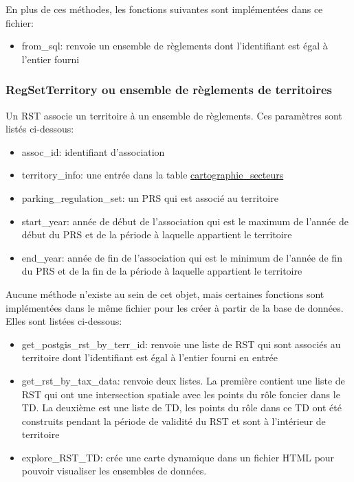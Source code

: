         En plus de ces méthodes, les fonctions suivantes sont implémentées dans ce fichier:
        \begin{itemize}
            \item from\_sql: renvoie un ensemble de règlements dont l'identifiant est égal à l'entier fourni
        \end{itemize}
        
        \subsubsection{RegSetTerritory ou ensemble de règlements de territoires}
        Un \ac{RST} associe un territoire à un ensemble de règlements. Ces paramètres sont listés ci-dessous:
        \begin{itemize}
            \item assoc\_id: identifiant d'association
            \item territory\_info: une entrée dans la table \underline{cartographie\_secteurs}
            \item parking\_regulation\_set: un \ac{PRS} qui est associé au territoire
            \item start\_year: année de début de l'association qui est le maximum de l'année de début du \ac{PRS} et de la période à laquelle appartient le territoire
            \item end\_year: année de fin de l'association qui est le minimum de l'année de fin du \ac{PRS} et de la fin de la période à laquelle appartient le territoire
        \end{itemize}
        Aucune méthode n'existe au sein de cet objet, mais certaines fonctions sont implémentées dans le même fichier pour les créer à partir de la base de données. Elles sont listées ci-dessous:
        \begin{itemize}
            \item get\_postgis\_rst\_by\_terr\_id: renvoie une liste de \ac{RST} qui sont associés au territoire dont l'identifiant est égal à l'entier fourni en entrée
            \item get\_rst\_by\_tax\_data: renvoie deux listes. La première contient une liste de \ac{RST} qui ont une intersection spatiale avec les points du rôle foncier dans le \ac{TD}. La deuxième est une liste de \ac{TD}, les points du rôle dans ce \ac{TD} ont été construits pendant la période de validité du \ac{RST} et sont à l'intérieur de territoire
            \item explore\_RST\_TD: crée une carte dynamique dans un fichier HTML pour pouvoir visualiser les ensembles de données.
        \end{itemize}

